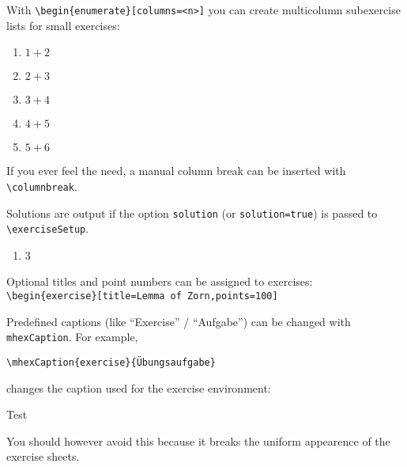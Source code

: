 \documentclass[german]{mhexsheet}
\begin{document}
\maketitle

\begin{exercise}
With \verb|\begin{enumerate}[columns=<n>]| you can create multicolumn subexercise lists for small exercises:
\begin{enumerate}[columns=3]
  \item $1+2$
  \item $2+3$
  \item $3+4$
  \item $4+5$
  \item $5+6$
\end{enumerate}
If you ever feel the need, a manual column break can be inserted with \verb|\columnbreak|.
\end{exercise}

\begin{solution}
Solutions are output if the option \verb|solution| (or \verb|solution=true|) is passed to \verb|\exerciseSetup|.
\begin{enumerate}
\item 3
\end{enumerate}
\end{solution}

\begin{exercise}[title=Lemma of Zorn,points=100]
Optional titles and point numbers can be assigned to exercises:\\
\verb!\begin{exercise}[title=Lemma of Zorn,points=100]!
\end{exercise}
Predefined captions (like \enquote{Exercise} / \enquote{Aufgabe}) can be changed with \verb|mhexCaption|. For example,
\begin{verbatim}
\mhexCaption{exercise}{Übungsaufgabe}
\end{verbatim}
changes the caption used for the exercise environment:
\begin{exercise}
Test
\end{exercise}
You should however avoid this because it breaks the uniform appearence of the exercise sheets.
\end{document}
